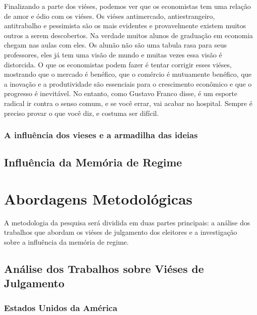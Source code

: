 Finalizando a parte dos viéses, podemos ver que os economistas tem uma relação de amor e ódio com os viéses. Os viéses antimercado, antiestrangeiro, antitrabalho e pessimista são os mais evidentes e provavelmente existem muitos outros a serem descobertos. Na verdade muitos alunos de graduação em economia chegam nas aulas com eles. Os alunão não são uma tabula rasa para seus professores, eles já tem uma visão de mundo e muitas vezes essa visão é distorcida. O que os economistas podem fazer é tentar corrigir esses viéses, mostrando que o mercado é benéfico, que o comércio é mutuamente benéfico, que a inovação e a produtividade são essenciais para o crescimento econômico e que o progresso é inevitável. No entanto, como Gustavo Franco disse, é um esporte radical ir contra o senso comum, e se você errar, vai acabar no hospital. Sempre é preciso provar o que você diz, e costuma ser difícil.

\subsubsection{A influência dos vieses e a armadilha das ideias}




\subsection{Influência da Memória de Regime}

\section{Abordagens Metodológicas}
A metodologia da pesquisa será dividida em duas partes principais: a análise dos trabalhos que abordam os viéses de julgamento dos eleitores e a investigação sobre a influência da memória de regime.

\subsection{Análise dos Trabalhos sobre Viéses de Julgamento}

\subsubsection{Estados Unidos da América}

